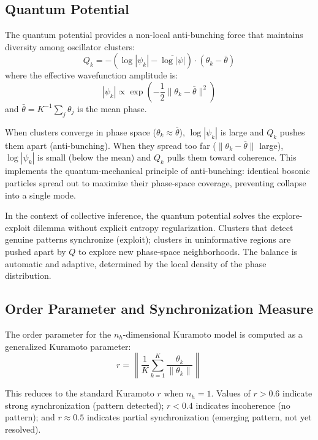 \documentclass[11pt,a4paper,twocolumn]{article}
\begin{document}
\subsection{Quantum Potential}
\label{sec:quantum_potential}

The quantum potential provides a non-local anti-bunching force that maintains diversity among oscillator clusters:
\begin{equation}
Q_k = -\left(\log|\psi_k| - \overline{\log|\psi|}\right) \cdot (\theta_k - \bar{\theta})
\label{eq:quantum_potential}
\end{equation}
where the effective wavefunction amplitude is:
\begin{equation}
|\psi_k| \propto \exp\!\left(-\frac{1}{2}\|\theta_k - \bar{\theta}\|^2\right)
\label{eq:psi_amplitude}
\end{equation}
and $\bar{\theta} = K^{-1}\sum_j \theta_j$ is the mean phase.

When clusters converge in phase space ($\theta_k \approx \bar{\theta}$), $\log|\psi_k|$ is large and $Q_k$ pushes them apart (anti-bunching).
When they spread too far ($\|\theta_k - \bar{\theta}\|$ large), $\log|\psi_k|$ is small (below the mean) and $Q_k$ pulls them toward coherence.
This implements the quantum-mechanical principle of anti-bunching: identical bosonic particles spread out to maximize their phase-space coverage, preventing collapse into a single mode.

In the context of collective inference, the quantum potential solves the explore-exploit dilemma without explicit entropy regularization.
Clusters that detect genuine patterns synchronize (exploit); clusters in uninformative regions are pushed apart by $Q$ to explore new phase-space neighborhoods.
The balance is automatic and adaptive, determined by the local density of the phase distribution.

\subsection{Order Parameter and Synchronization Measure}

The order parameter for the $n_h$-dimensional Kuramoto model is computed as a generalized Kuramoto parameter:
\begin{equation}
r = \left\|\frac{1}{K}\sum_{k=1}^{K} \frac{\theta_k}{\|\theta_k\|}\right\|
\label{eq:order_param}
\end{equation}

This reduces to the standard Kuramoto $r$ when $n_h = 1$.
Values of $r > 0.6$ indicate strong synchronization (pattern detected); $r < 0.4$ indicates incoherence (no pattern); and $r \approx 0.5$ indicates partial synchronization (emerging pattern, not yet resolved).
\end{document}
